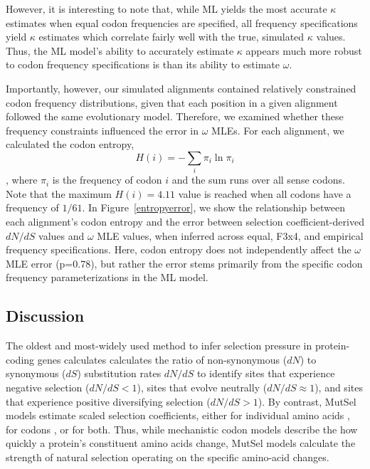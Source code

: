 \documentclass[11pt]{article}
\begin{document}
However, it is interesting to note that, while ML yields the most accurate $\kappa$ estimates when equal codon frequencies are specified, all frequency specifications yield $\kappa$ estimates which correlate fairly well with the true, simulated $\kappa$ values. Thus, the ML model's ability to accurately estimate $\kappa$ appears much more robust to codon frequency specifications is than its ability to estimate $\omega$.

Importantly, however, our simulated alignments contained relatively constrained codon frequency distributions, given that each position in a given alignment followed the same evolutionary model. Therefore, we examined whether these frequency constraints influenced the error in $\omega$ MLEs. For each alignment, we calculated the codon entropy, \begin{equation} H(i) = - \sum_i \pi_i \ln \pi_i \end{equation}, where $\pi_i$ is the frequency of codon $i$ and the sum runs over all sense codons. Note that the maximum $H(i) = 4.11$ value is reached when all codons have a frequency of $1/61$. In Figure~\ref{entropyerror}, we show the relationship between each alignment's codon entropy and the error between selection coefficient-derived $dN/dS$ values and $\omega$ MLE values, when inferred across equal, F3x4, and empirical frequency specifications. Here, codon entropy does not independently affect the $\omega$ MLE error (p=0.78), but rather the error stems primarily from the specific codon frequency parameterizations in the ML model. 



\subsection*{Discussion}
The oldest and most-widely used method to infer selection pressure in protein-coding genes calculates calculates the ratio of non-synonymous ($dN$) to synonymous ($dS$) substitution rates $dN/dS$ to identify sites that experience negative selection ($dN/dS<1$), sites that evolve neutrally ($dN/dS\approx1$), and sites that experience positive diversifying selection ($dN/dS>1$). By contrast, MutSel models estimate scaled selection coefficients, either for individual amino acids \cite{HalpernBruno1998,Bruno1996,Rodrigueetal2010,Tamurietal2012,Tamurietal2014}, for codons \cite{YangNielsen2008}, or for both. Thus, while mechanistic codon models describe the how quickly a protein's constituent amino acids change, MutSel models calculate the strength of natural selection operating on the specific amino-acid changes.  
\end{document}

